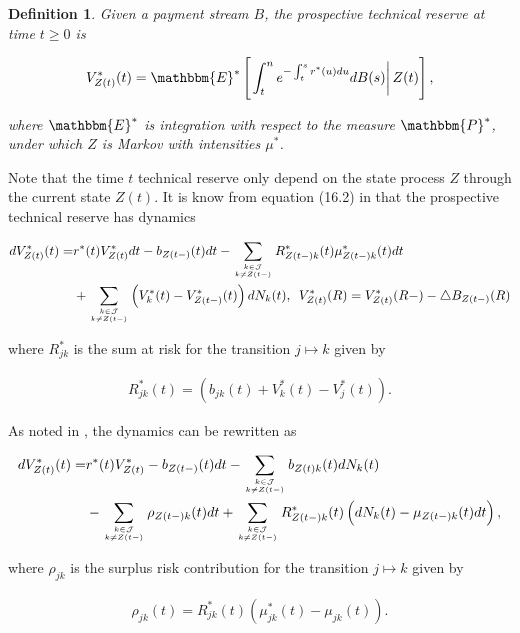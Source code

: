 \documentclass{article}
\newcommand{\1}[1]{\mathbbm{1}_{\left\lbrace #1 \right\rbrace}}
\newcommand{\econdStar}[2][def]{\mathbbm{E}^* \left[ \left. #1 \right| #2 \right]}
\theoremstyle{break}
\newtheorem{definition}{Definition}[section]
\theoremstyle{remark}
\numberwithin{equation}{section}
\begin{document}
\begin{definition}
	Given a payment stream $B$, the prospective technical reserve at time $t \geq 0$ is
	
	\begin{align*}
		V_{Z(t)}^*(t) = \econdStar[\int_t^n e^{-\int_t^s r^*(u)du} dB(s)]{Z(t)},
	\end{align*}
	
	where $\mathbbm{E}^*$ is integration with respect to the measure $\mathbbm{P}^*$, under which $Z$ is Markov with intensities $\mu^*$.
\end{definition}

Note that the time $t$ technical reserve only depend on the state process $Z$ through the current state $Z(t)$. It is know from equation (16.2) in \cite{LivStok} that the prospective technical reserve has dynamics

\begin{align*}
	dV_{Z(t)}^*(t) =& r^*(t) V_{Z(t)}^* dt - b_{Z(t-)}(t) dt - \sum_{k \in \mathcal{J} \atop k \neq Z(t-)} R_{Z(t-)k}^*(t) \mu_{Z(t-)k}^*(t) dt \\
	&+ \sum_{k \in \mathcal{J} \atop k \neq Z(t-)} \left( V_k^*(t) - V_{Z(t-)}^*(t) \right) dN_k(t), \, \, \, V_{Z(t)}^*(R) =  V_{Z(t)}^*(R-) - \triangle B_{Z(t-)}(R)
\end{align*}

where $R_{jk}^*$ is the sum at risk for the transition $j \mapsto k$ given by

\begin{align*}
	R_{jk}^*(t) = \left( b_{jk}(t) + V_{k}^*(t) - V_{j}^*(t) \right).
\end{align*}

As noted in \cite{Lollike}, the dynamics can be rewritten as

\begin{align} \label{ReserveDynamics}
\begin{split}
	dV_{Z(t)}^*(t) =& r^*(t) V_{Z(t)}^* - b_{Z(t-)}(t) dt - \sum_{k \in \mathcal{J} \atop k \neq Z(t-)} b_{Z(t)k}(t) dN_k(t) \\
	&- \sum_{k \in \mathcal{J} \atop k \neq Z(t-)} \rho_{Z(t-)k}(t) dt + \sum_{k \in \mathcal{J} \atop k \neq Z(t-)} R_{Z(t-)k}^*(t) \left( dN_k(t) - \mu_{Z(t-)k}(t) dt \right),
\end{split}
\end{align}

where $\rho_{jk}$ is the surplus risk contribution for the transition $j \mapsto k$ given by

\begin{align*}
	\rho_{jk}(t) = R_{jk}^*(t) \left( \mu_{jk}^*(t) - \mu_{jk}(t) \right).
\end{align*}
\end{document}
